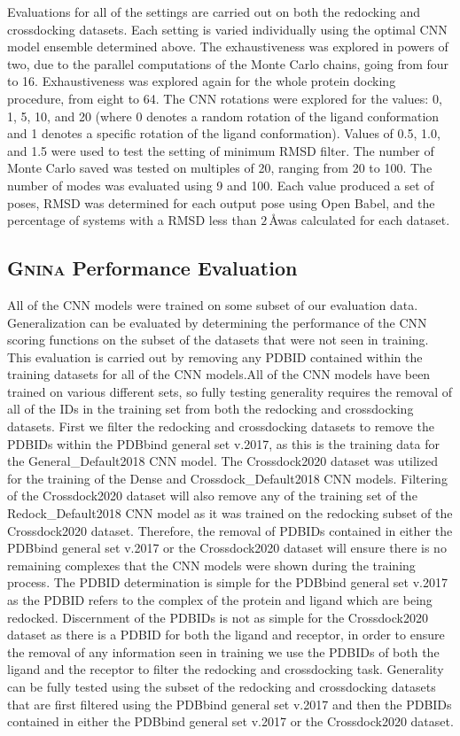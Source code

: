 \documentclass[journal=jcisd8,manuscript=article]{achemso}
\begin{document}
Evaluations for all of the settings are carried out on both the redocking and crossdocking datasets. Each setting is varied individually using the optimal CNN model ensemble determined above. The exhaustiveness was explored in powers of two, due to the parallel computations of the Monte Carlo chains, going from four to 16. Exhaustiveness was explored again for the whole protein docking procedure, from eight to 64. The CNN rotations were explored for the values: 0, 1, 5, 10, and 20 (where 0 denotes a random rotation of the ligand conformation and 1 denotes a specific rotation of the ligand conformation). Values of 0.5, 1.0, and 1.5 were used to test the setting of minimum RMSD filter. The number of Monte Carlo saved was tested on multiples of 20, ranging from 20 to 100. The number of modes was evaluated using 9 and 100. Each value produced a set of poses, RMSD was determined for each output pose using Open Babel, and the percentage of systems with a RMSD less than $2\,$\AA was calculated for each dataset.

\subsection{\textsc{Gnina} Performance Evaluation}
All of the CNN models were trained on some subset of our evaluation data. Generalization can be evaluated by determining the performance of the CNN scoring functions on the subset of the datasets that were not seen in training. This evaluation is carried out by removing any PDBID contained within the training datasets for all of the CNN models.All of the CNN models have been trained on various different sets, so fully testing generality requires the removal of all of the IDs in the training set from both the redocking and crossdocking datasets. First we filter the redocking and crossdocking datasets to remove the PDBIDs within the PDBbind general set v.2017, as this is the training data for the General\_Default2018 CNN model. The Crossdock2020 dataset was utilized for the training of the Dense and Crossdock\_Default2018 CNN models. Filtering of the Crossdock2020 dataset will also remove any of the training set of the Redock\_Default2018 CNN model as it was trained on the redocking subset of the Crossdock2020 dataset. Therefore, the removal of PDBIDs contained in either the PDBbind general set v.2017 or the Crossdock2020 dataset will ensure there is no remaining complexes that the CNN models were shown during the training process. The PDBID determination is simple for the PDBbind general set v.2017 as the PDBID refers to the complex of the protein and ligand which are being redocked. Discernment of the PDBIDs is not as simple for the Crossdock2020 dataset as there is a PDBID for both the ligand and receptor, in order to ensure the removal of any information seen in training we use the PDBIDs of both the ligand and the receptor to filter the redocking and crossdocking task. Generality can be fully tested using the subset of the redocking and crossdocking datasets that are first filtered using the PDBbind general set v.2017 and then the PDBIDs contained in either the PDBbind general set v.2017 or the Crossdock2020 dataset. 
\end{document}
